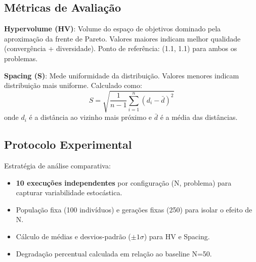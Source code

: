\subsection{Métricas de Avaliação}
\textbf{Hypervolume (HV)}: Volume do espaço de objetivos dominado pela aproximação da frente de Pareto. Valores maiores indicam melhor qualidade (convergência + diversidade). Ponto de referência: (1.1, 1.1) para ambos os problemas.

\textbf{Spacing (S)}: Mede uniformidade da distribuição. Valores menores indicam distribuição mais uniforme. Calculado como:
$$
S = \sqrt{\frac{1}{n-1} \sum_{i=1}^{n} (d_i - \bar{d})^2}
$$
onde $d_i$ é a distância ao vizinho mais próximo e $\bar{d}$ é a média das distâncias.

\subsection{Protocolo Experimental}
Estratégia de análise comparativa:
\begin{itemize}
  \item \textbf{10 execuções independentes} por configuração (N, problema) para capturar variabilidade estocástica.
  \item População fixa (100 indivíduos) e gerações fixas (250) para isolar o efeito de N.
  \item Cálculo de médias e desvios-padrão ($\pm 1\sigma$) para HV e Spacing.
  \item Degradação percentual calculada em relação ao baseline N=50.
\end{itemize}